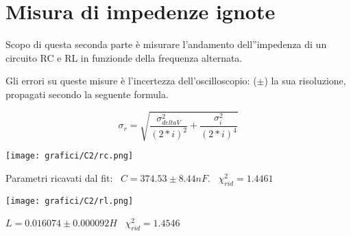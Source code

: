 %
%
%
%
%

\section{Misura di impedenze ignote}

Scopo di questa seconda parte è misurare l'andamento dell''impedenza di un circuito RC e RL in funzionde della frequenza alternata.

Gli errori su queste misure è l'incertezza dell'oscilloscopio: ($\pm$) la sua risoluzione, propagati secondo la seguente formula.

$$\sigma_r = \sqrt{\frac{\sigma_{deltaV}^2}{(2*i)^2} + \frac{\sigma_{i}^2}{(2*i)^4}}$$



\begin{center}
\texttt{[image: grafici/C2/rc.png]} 
\end{center}
Parametri ricavati dal fit:
\
$C = 374.53\pm 8.44 nF$.
\
$\chi_{rid}^2= 1.4461 $ 



\begin{center}
\texttt{[image: grafici/C2/rl.png]} 
\end{center}

$L = 0.016074\pm 0.000092 H$ \
$\chi_{rid}^2 = 1.4546$ 




